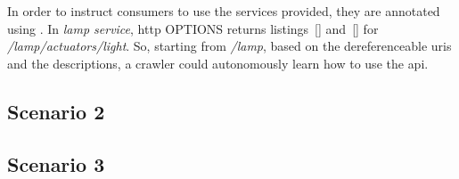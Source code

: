 In order to instruct consumers to use the services provided, they are annotated using \restdesc{}.
In \emph{lamp service}, \acs{http} OPTIONS returns listings~\ref{} and~\ref{} for \emph{/lamp/actuators/light}.
So, starting from \emph{/lamp}, based on the dereferenceable \acsp{uri} and the descriptions, a crawler could autonomously learn how to use the \acs{api}.




\subsection{Scenario 2}
\label{sec:actuation_scn2}



\subsection{Scenario 3}
\label{sec:actuation_scn3}



